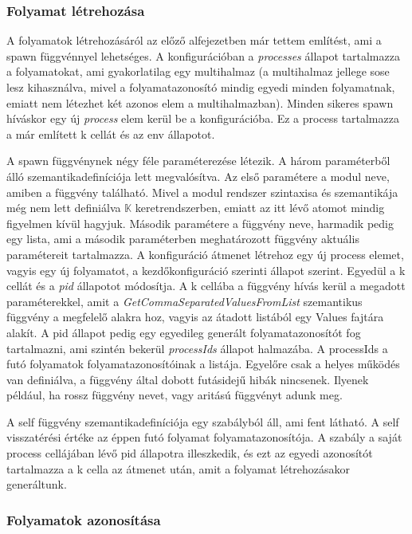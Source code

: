 \subsubsection{Folyamat létrehozása}
A folyamatok létrehozásáról az előző alfejezetben már tettem említést, ami a spawn függvénnyel lehetséges. A konfigurációban a \textit{processes} állapot tartalmazza a folyamatokat, ami gyakorlatilag egy multihalmaz (a multihalmaz jellege sose lesz kihasználva, mivel a folyamatazonosító mindig egyedi minden folyamatnak, emiatt nem létezhet két azonos elem a multihalmazban). Minden sikeres spawn híváskor egy új \textit{process} elem kerül be a konfigurációba. Ez a process tartalmazza a már említett k cellát és az env állapotot.

A spawn függvénynek négy féle paraméterezése létezik. A három paraméterből álló szemantikadefiníciója lett megvalósítva. Az első paramétere a modul neve, amiben a függvény található. Mivel a modul rendszer szintaxisa és szemantikája még nem lett definiálva $\mathbb{K}$ keretrendszerben, emiatt az itt lévő atomot mindig figyelmen kívül hagyjuk. Második paramétere a függvény neve, harmadik pedig egy lista, ami a második paraméterben meghatározott függvény aktuális paramétereit tartalmazza. A konfiguráció átmenet létrehoz egy új process elemet, vagyis egy új folyamatot, a kezdőkonfiguráció szerinti állapot szerint. Egyedül a k cellát és a \textit{pid} állapotot módosítja. A k cellába a függvény hívás kerül a megadott paraméterekkel, amit a \textit{GetCommaSeparatedValuesFromList} szemantikus függvény a megfelelő alakra hoz, vagyis az átadott listából egy Values fajtára alakít. A pid állapot pedig egy egyedileg generált folyamatazonosítót fog tartalmazni, ami szintén bekerül \textit{processIds} állapot halmazába. A processIds a futó folyamatok folyamatazonosítóinak a listája. Egyelőre csak a helyes működés van definiálva, a függvény által dobott futásidejű hibák nincsenek. Ilyenek például, ha rossz függvény nevet, vagy aritású függvényt adunk meg.



A self függvény szemantikadefiníciója egy szabályból áll, ami fent látható. A self visszatérési értéke az éppen futó folyamat folyamatazonosítója. A szabály a saját process cellájában lévő pid állapotra illeszkedik, és ezt az egyedi azonosítót tartalmazza a k cella az átmenet után, amit a folyamat létrehozásakor generáltunk.

\subsubsection{Folyamatok azonosítása}

